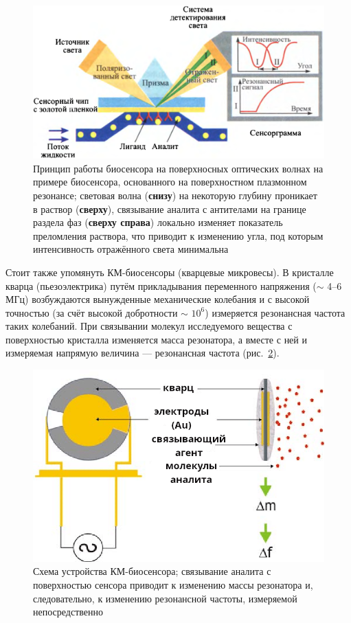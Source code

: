 \documentclass[oneside,final,12pt]{extreport}
\begin{document}
\begin{figure}
  \centering
  \includegraphics[width=.8\textwidth]{pic/spr_biosensor_principle}

  \caption{%
    \label{fig:spr_biosensor_principle}%
    Принцип работы биосенсора на поверхносных оптических волнах
    на примере биосенсора, основанного на поверхностном плазмонном резонансе;
    световая волна (\textbf{снизу}) на некоторую глубину проникает в раствор (\textbf{сверху}),
    связывание аналита с антителами на границе раздела фаз (\textbf{сверху справа})
    локально изменяет показатель преломления раствора, что приводит к изменению
    угла, под которым интенсивность отражённого света минимальна
  }

\end{figure}

Стоит также упомянуть КМ-биосенсоры (кварцевые микровесы).
В кристалле кварца (пьезоэлектрика) путём прикладывания переменного напряжения
($\sim$ 4--6 МГц)
возбуждаются вынужденные механические колебания и с высокой точностью
(за счёт высокой добротности $\sim$ $10^6$)
измеряется резонансная частота таких колебаний.
При связывании молекул исследуемого вещества с поверхностью кристалла
изменяется масса резонатора, а вместе с ней и измеряемая напрямую величина ---
резонансная частота (рис.~\ref{fig:qcm_rus})\cite{bib:qcm_odor}.

\begin{figure}
  \centering
  \includegraphics[width=.7\textwidth]{pic/qcm_rus}

  \caption{%
    \label{fig:qcm_rus}%
    Схема устройства КМ-биосенсора;
    связывание аналита с поверхностью сенсора приводит
    к изменению массы резонатора и, следовательно,
    к изменению резонансной частоты, измеряемой непосредственно
  }

\end{figure}
\end{document}
